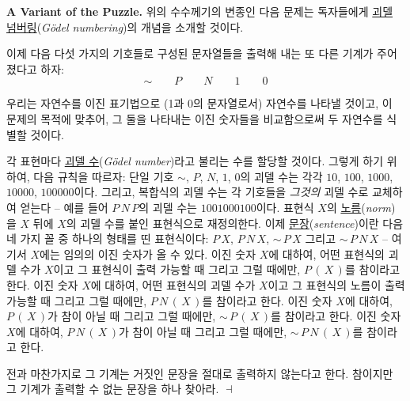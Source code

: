 \documentclass[12pt]{paper}
\newenvironment{context}[1][]{\noindent \textbf{{#1}.}}{\hfill $ \dashv $}
\begin{document}
  \begin{context}[A Variant of the Puzzle]
    위의 수수께기의 변종인 다음 문제는 독자들에게 \underline{괴델 넘버링}(\textit{G\"odel numbering})의 개념을 소개할 것이다.

    이제 다음 다섯 가지의 기호들로 구성된 문자열들을 출력해 내는 또 다른 기계가 주어졌다고 하자:
    $$ \sim \qquad P \qquad N \qquad 1 \qquad 0 $$

    우리는 자연수를 이진 표기법으로 (1과 0의 문자열로서) 자연수를 나타낼 것이고,
    이 문제의 목적에 맞추어,
    그 둘을 나타내는 이진 숫자들을 비교함으로써 두 자연수를 식별할 것이다.

    각 표현마다 \underline{괴델 수}(\textit{G\"odel number})라고 불리는 수를 할당할 것이다.
    그렇게 하기 위하여, 다음 규칙을 따르자:
    단일 기호 $\sim$, $P$, $N$, $1$, $0$의 괴델 수는 각각 $10$, $100$, $1000$, $10000$, $100000$이다.
    그리고, 복합식의 괴델 수는 각 기호들을 \textit{그것의} 괴델 수로 교체하여 얻는다 --
    예를 들어 $P \, N \, P$의 괴델 수는 $1001000100$이다.
    표현식 $X$의 \underline{노름}(\textit{norm})을 $X$ 뒤에 $X$의 괴델 수를 붙인 표현식으로 재정의한다.
    이제 \underline{문장}(\textit{sentence})이란 다음 네 가지 꼴 중 하나의 형태를 띤 표현식이다:
    $P \, X$, $P \, N \, X$, $\sim \, P \, X$ 그리고 $\sim \, P \, N \, X$ --
    여기서 $X$에는 임의의 이진 숫자가 올 수 있다.
    이진 숫자 $X$에 대하여, 어떤 표현식의 괴델 수가 $X$이고 그 표현식이 출력 가능할 때 그리고 그럴 때에만,
    $P \, \left( \, X \, \right)$를 참이라고 한다.
    이진 숫자 $X$에 대하여, 어떤 표현식의 괴델 수가 $X$이고 그 표현식의 노름이 출력 가능할 때 그리고 그럴 때에만,
    $P \, N \, \left( \, X \, \right)$를 참이라고 한다.
    이진 숫자 $X$에 대하여, $P \, \left( \, X \, \right)$가 참이 아닐 때 그리고 그럴 때에만,
    $\sim \, P \, \left( \, X \, \right)$를 참이라고 한다.
    이진 숫자 $X$에 대하여, $P \, N \, \left( \, X \, \right)$가 참이 아닐 때 그리고 그럴 때에만,
    $\sim \, P \, N \, \left( \, X \, \right)$를 참이라고 한다.

    전과 마찬가지로 그 기계는 거짓인 문장을 절대로 출력하지 않는다고 한다.
    참이지만 그 기계가 출력할 수 없는 문장을 하나 찾아라.
  \end{context}
\end{document}
